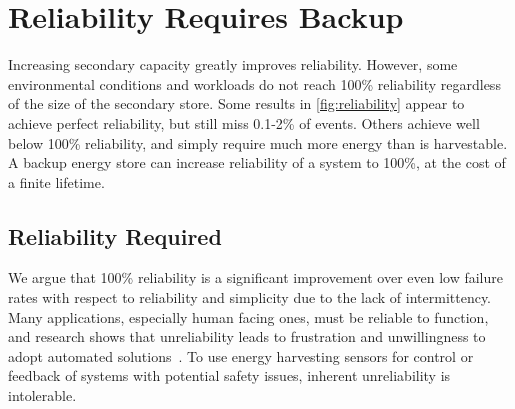 \section{Reliability Requires Backup}
\label{sec:primary}

Increasing secondary capacity greatly improves
reliability.
However, some environmental
conditions and workloads do not reach 100\% reliability regardless of the size
of the secondary store.
Some results in \cref{fig:reliability}
appear to achieve perfect reliability, but still miss 0.1-2\% of events.
Others achieve well below 100\% reliability, %
and simply require much more energy
than is harvestable. A backup energy store can increase reliability of a system
to 100\%, at the cost of a finite lifetime.

\subsection{Reliability Required}
\label{sec:primary:reliability}

We argue that 100\% reliability is a significant improvement over
even low failure rates with respect to reliability
and simplicity due to the lack of intermittency.
Many applications, especially human facing ones,
must be reliable to function, and research shows that unreliability
leads to frustration and %
unwillingness to adopt automated solutions~\cite{brushHome11, edwardsHome01, shehanHome07}.
To use energy harvesting sensors for control or feedback of systems with potential
safety issues, inherent unreliability is intolerable.

